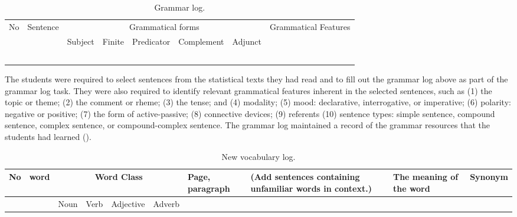 \documentclass[english]{textolivre}
\begin{document}
\begin{table}[h!]
\begin{threeparttable}
\caption{Grammar log.}
\label{tab02}
\centering
\begin{tabular}{cccccccc}
\toprule
No & Sentence & \multicolumn{5}{c}{Grammatical forms} & \multirow{2}{*}{Grammatical Features} \\
\cmidrule{3-7}
 & & Subject & Finite & Predicator & Complement & Adjunct \\
\midrule
\arrayrulecolor[gray]{.7}
\\
\midrule
\\
\midrule
\\
\midrule
\\
\arrayrulecolor{black}
\bottomrule
\end{tabular}
\end{threeparttable}
\end{table}

The students were required to select sentences from the statistical texts they had read and to fill out the grammar log above as part of the grammar log task. They were also required to identify relevant grammatical features inherent in the selected sentences, such as (1) the topic or theme; (2) the comment or rheme; (3) the tense; and (4) modality; (5) mood: declarative, interrogative, or imperative; (6) polarity: negative or positive; (7) the form of active-passive; (8) connective devices; (9) referents (10) sentence types: simple sentence, compound sentence, complex sentence, or compound-complex sentence. The grammar log maintained a record of the grammar resources that the students had learned ().

\begin{table}[h!]
\begin{threeparttable}
\begin{small}
\caption{New vocabulary log.}
\label{tab03}
\centering
\begin{tabular}{p{}p{}p{}p{}p{}p{}p{}p{}p{}p{}}
\toprule
No & word & \multicolumn{4}{c}{Word Class} & Page, paragraph & (Add sentences containing unfamiliar words in context.) & The meaning of the word & Synonym \\
\midrule
 & & Noun & Verb & Adjective & Adverb & & & & \\
\bottomrule
\end{tabular}
\end{small}
\end{threeparttable}
\end{table}
\end{document}
